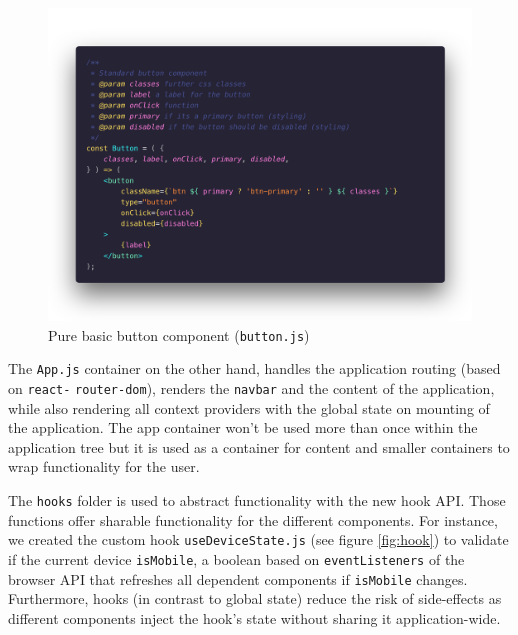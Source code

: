 \vspace{-2em}
\begin{figure}[!ht]
	\captionsetup{justification=centering}
	\centering
		\includegraphics[scale=0.28]{Ressourcen/img/code/button.png}
		\vspace{-3em}
		\caption{Pure basic button component (\texttt{button.js})}
		\label{fig:button}
\end{figure}

The \texttt{App.js} container on the other hand, handles the application routing (based on \texttt{react-} \texttt{router-dom}), renders the \texttt{navbar} and the content of the application, while also rendering all context providers with the global state on mounting of the application. The app container won’t be used more than once within the application tree but it is used as a container for content and smaller containers to wrap functionality for the user. 

The \texttt{hooks} folder is used to abstract functionality with the new hook API. Those functions offer sharable functionality for the different components. For instance, we created the custom hook \texttt{useDeviceState.js} (see figure \ref{fig:hook})  to validate if the current device \texttt{isMobile}, a boolean based on \texttt{eventListeners} of the browser API that refreshes all dependent components if \texttt{isMobile} changes. Furthermore, hooks (in contrast to global state) reduce the risk of side-effects as different components inject the hook's state without sharing it application-wide. 

